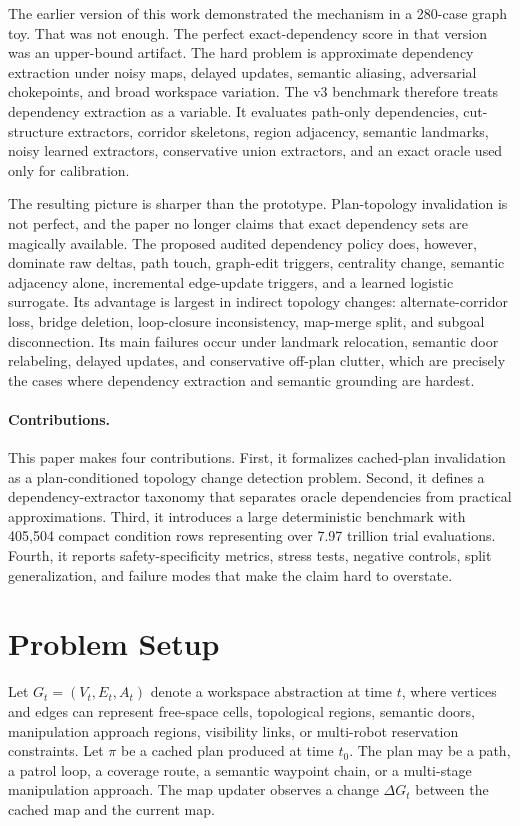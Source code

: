 \documentclass{article}
\begin{document}
The earlier version of this work demonstrated the mechanism in a 280-case graph toy. That was not enough. The perfect exact-dependency score in that version was an upper-bound artifact. The hard problem is approximate dependency extraction under noisy maps, delayed updates, semantic aliasing, adversarial chokepoints, and broad workspace variation. The v3 benchmark therefore treats dependency extraction as a variable. It evaluates path-only dependencies, cut-structure extractors, corridor skeletons, region adjacency, semantic landmarks, noisy learned extractors, conservative union extractors, and an exact oracle used only for calibration.

The resulting picture is sharper than the prototype. Plan-topology invalidation is not perfect, and the paper no longer claims that exact dependency sets are magically available. The proposed audited dependency policy does, however, dominate raw deltas, path touch, graph-edit triggers, centrality change, semantic adjacency alone, incremental edge-update triggers, and a learned logistic surrogate. Its advantage is largest in indirect topology changes: alternate-corridor loss, bridge deletion, loop-closure inconsistency, map-merge split, and subgoal disconnection. Its main failures occur under landmark relocation, semantic door relabeling, delayed updates, and conservative off-plan clutter, which are precisely the cases where dependency extraction and semantic grounding are hardest.

\paragraph{Contributions.}
This paper makes four contributions. First, it formalizes cached-plan invalidation as a plan-conditioned topology change detection problem. Second, it defines a dependency-extractor taxonomy that separates oracle dependencies from practical approximations. Third, it introduces a large deterministic benchmark with 405,504 compact condition rows representing over 7.97 trillion trial evaluations. Fourth, it reports safety-specificity metrics, stress tests, negative controls, split generalization, and failure modes that make the claim hard to overstate.

\section{Problem Setup}

Let $G_t=(V_t,E_t,A_t)$ denote a workspace abstraction at time $t$, where vertices and edges can represent free-space cells, topological regions, semantic doors, manipulation approach regions, visibility links, or multi-robot reservation constraints. Let $\pi$ be a cached plan produced at time $t_0$. The plan may be a path, a patrol loop, a coverage route, a semantic waypoint chain, or a multi-stage manipulation approach. The map updater observes a change $\Delta G_t$ between the cached map and the current map.
\end{document}
